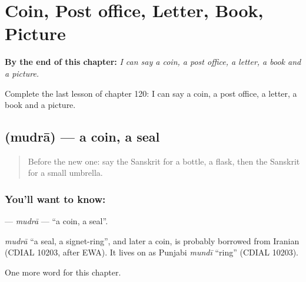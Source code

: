 
\chapter{Coin, Post office, Letter, Book, Picture}
\label{ch:sa-coin-post-office-letter-book-picture}

\begin{chapteropening}
\textbf{By the end of this chapter:} \emph{I can say a coin, a post office, a letter, a book and a picture.}

Complete the last lesson of chapter 120: I can say a coin, a post office, a letter, a book and a picture.
\end{chapteropening}

\section[\texorpdfstring{\sk{मुद्रा} (mudrā)}{मुद्रा (mudrā)}]{ (mudrā) — a coin, a seal}

\label{lesson:SA-C120-mudra}



\begin{quote}
Before the new one: say the Sanskrit for a bottle, a flask, then the Sanskrit for a small umbrella.
\end{quote}

\subsection*{You'll want to know: }
\textbf{} — \emph{mudrā} — \textquotedblleft{}a coin, a seal\textquotedblright{}.

\begin{cousinweb}
\emph{mudrā} \textquotedblleft{}a seal, a signet-ring\textquotedblright{}, and later a coin, is probably borrowed from Iranian (CDIAL 10203, after EWA). It lives on as Punjabi \emph{mundī} \textquotedblleft{}ring\textquotedblright{} (CDIAL 10203).
\end{cousinweb}

\begin{grammarlens}[title={What you've built}]
One more word for this chapter.
\end{grammarlens}

